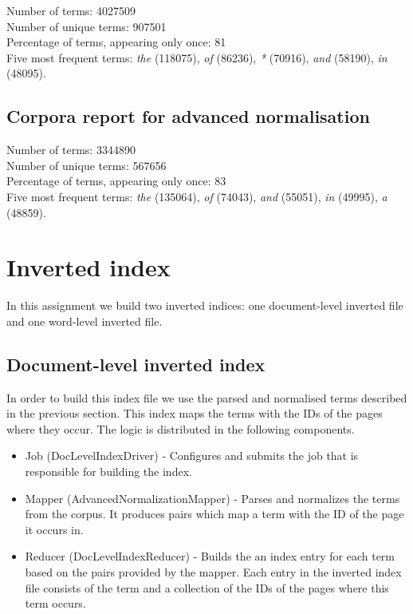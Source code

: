 \documentclass[a4paper, notitlepage]{report}
\begin{document}
Number of terms: 4027509\\
Number of unique terms: 907501\\
Percentage of terms, appearing only once: 81\\
Five most frequent terms: \emph{the} (118075), \emph{of} (86236), \emph{*} (70916), \emph{and} (58190), \emph{in} (48095).


\subsection{Corpora report for advanced normalisation}

Number of terms: 3344890\\
Number of unique terms: 567656\\
Percentage of terms, appearing only once: 83\\
Five most frequent terms: \emph{the} (135064), \emph{of} (74043), \emph{and} (55051), \emph{in} (49995), \emph{a} (48859).

\section{Inverted index}
In this assignment we build two inverted indices: one document-level inverted file and one word-level inverted file.

\subsection{Document-level inverted index}
In order to build this index file we use the parsed and normalised terms described in the previous section. This index maps the terms with the IDs of the pages where they occur. The logic is distributed in the following components.

\begin{itemize}
	\item Job (DocLevelIndexDriver) - Configures and submits the job that is responsible for building the index.
	\item Mapper (AdvancedNormalizationMapper) - Parses and normalizes the terms from the corpus. It produces pairs which map a term with the ID of the page it occurs in.
	\item Reducer (DocLevelIndexReducer) - Builds the an index entry for each term based on the pairs provided by the mapper. Each entry in the inverted index file consists of the term and a collection of the IDs of the pages where this term occurs.  
\end{itemize}
\end{document}
